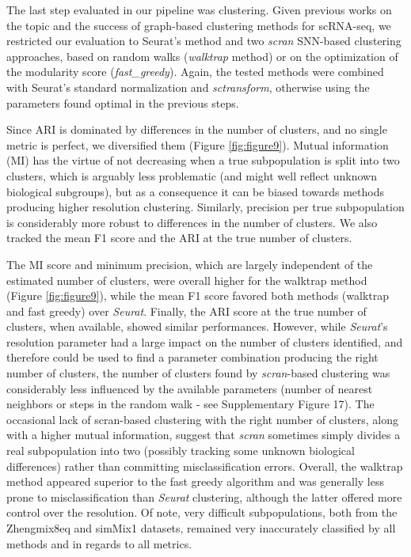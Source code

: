 \documentclass{bmcart}
\begin{document}
The last step evaluated in our pipeline was clustering. Given previous works on the topic \citep{duoClustering2018,freytagComparison2018} and the success of graph-based clustering methods for scRNA-seq, we restricted our evaluation to Seurat's method and two \textit{scran} SNN-based clustering approaches, based on random walks (\textit{walktrap} method) or on the optimization of the modularity score (\textit{fast\_greedy}). Again, the tested methods were combined with Seurat's standard normalization and \textit{sctransform}, otherwise using the parameters found optimal in the previous steps. 

Since ARI is dominated by differences in the number of clusters, and no single metric is perfect, we diversified them (Figure \ref{fig:figure9}). Mutual information (MI) has the virtue of not decreasing when a true subpopulation is split into two clusters, which is arguably less problematic (and might well reflect unknown biological subgroups), but as a consequence it can be biased towards methods producing higher resolution clustering. Similarly, precision per true subpopulation is considerably more robust to differences in the number of clusters. We also tracked the mean F1 score and the ARI at the true number of clusters. 

The MI score and minimum precision, which are largely independent of the estimated number of clusters, were overall higher for the walktrap method (Figure \ref{fig:figure9}), while the mean F1 score favored both  methods (walktrap and fast greedy) over \textit{Seurat}. Finally, the ARI score at the true number of clusters, when available, showed similar performances. However, while \textit{Seurat}'s resolution parameter had a large impact on the number of clusters identified, and therefore could be used to find a parameter combination producing the right number of clusters, the number of clusters found by \textit{scran}-based clustering was considerably less influenced by the available parameters (number of nearest neighbors or steps in the random walk - see Supplementary Figure 17). The occasional lack of scran-based clustering with the right number of clusters, along with a higher mutual information, suggest that \textit{scran} sometimes simply divides a real subpopulation into two (possibly tracking some unknown biological differences) rather than committing misclassification errors. Overall, the walktrap method appeared superior to the fast greedy algorithm and was generally less prone to misclassification than \textit{Seurat} clustering, although the latter offered more control over the resolution. Of note, very difficult subpopulations, both from the Zhengmix8eq and simMix1 datasets, remained very inaccurately classified by all methods and in regards to all metrics.
\end{document}
